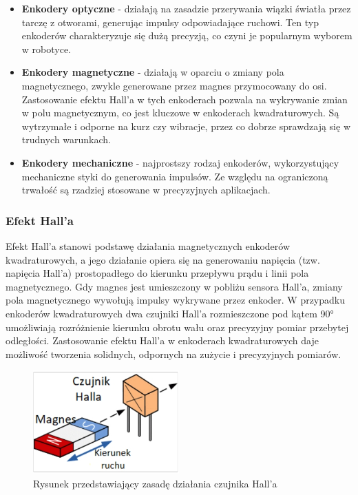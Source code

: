 \begin{itemize}
    \item \textbf{Enkodery optyczne} - działają na zasadzie przerywania wiązki światła przez tarczę z otworami, generując impulsy odpowiadające ruchowi. Ten typ enkoderów charakteryzuje się dużą precyzją, co czyni je popularnym wyborem w robotyce.
    \item \textbf{Enkodery magnetyczne} - działają w oparciu o zmiany pola magnetycznego, zwykle generowane przez magnes przymocowany do osi. Zastosowanie efektu Hall'a w tych enkoderach pozwala na wykrywanie zmian w polu magnetycznym, co jest kluczowe w enkoderach kwadraturowych. Są wytrzymałe i odporne na kurz czy wibracje, przez co dobrze sprawdzają się w trudnych warunkach.
    \item \textbf{Enkodery mechaniczne} - najprostszy rodzaj enkoderów, wykorzystujący mechaniczne styki do generowania impulsów. Ze względu na ograniczoną trwałość są rzadziej stosowane w precyzyjnych aplikacjach.
\end{itemize}



\subsubsection{Efekt Hall'a}

Efekt Hall'a stanowi podstawę działania magnetycznych enkoderów kwadraturowych, a jego działanie opiera się na generowaniu napięcia (tzw. napięcia Hall'a) prostopadłego do kierunku przepływu prądu i linii pola magnetycznego. Gdy magnes jest umieszczony w pobliżu sensora Hall'a, zmiany pola magnetycznego wywołują impulsy wykrywane przez enkoder. W przypadku enkoderów kwadraturowych dwa czujniki Hall'a rozmieszczone pod kątem 90° umożliwiają rozróżnienie kierunku obrotu wału oraz precyzyjny pomiar przebytej odległości. Zastosowanie efektu Hall'a w enkoderach kwadraturowych daje możliwość tworzenia solidnych, odpornych na zużycie i precyzyjnych pomiarów.


\begin{figure}[h]
    \centering
    \includegraphics[width=0.5\textwidth]{./graf/halla-enc.jpg}
    \caption{Rysunek przedstawiający zasadę działania czujnika Hall'a \cite{bib:hall_net}}
    \label{rys2:encoders-graf}
\end{figure}

